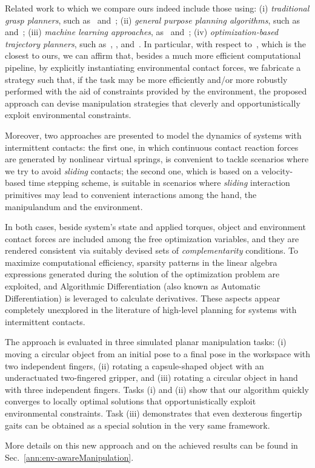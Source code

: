 Related work to which we compare ours indeed include those using: (i) \emph{traditional grasp planners}, such as~\cite{Diankov:PHDTHESIS:2010} and~\cite{Miller:GRASPIT:2004}; (ii) \emph{general purpose planning algorithms}, such as~\cite{Koga:ICRA:1994} and~\cite{Cohen:RSS:2014}; (iii) \emph{machine learning approaches}, as~\cite{Levine:NIPS:2014} and~\cite{Levine:PREPRINT:2014}; (iv) \emph{optimization-based trajectory planners}, such as~\cite{Mordatch:ACMSCA:2012}, \cite{Mordatch:RSS:2014}, and~\cite{Posa:IJRR:2014}. In particular, with respect to~\cite{Posa:IJRR:2014}, which is the closest to ours, we can affirm that, besides a much more efficient computational pipeline, by explicitly instantiating environmental contact forces, we fabricate a strategy such that, if the task may be more efficiently and/or more robustly performed with the aid of constraints provided by the environment, the proposed approach can devise manipulation strategies that cleverly and opportunistically exploit environmental constraints.

Moreover, 
two approaches are presented to model the dynamics of systems with intermittent contacts: the first one, in which continuous contact reaction forces are generated  by nonlinear virtual springs, is convenient to tackle scenarios where we try to avoid \emph{sliding} contacts; the second one, which is based on a velocity-based time stepping scheme, is suitable in scenarios where \emph{sliding} interaction primitives may lead to convenient interactions among the hand, the manipulandum and the environment.

In both cases, beside system's state and applied torques, object and environment contact forces are included among the free optimization variables, and they are rendered consistent via suitably devised sets of \emph{complementarity} conditions. To maximize computational efficiency, sparsity patterns in the linear algebra expressions generated during the solution of the optimization problem are exploited, and Algorithmic Differentiation (also known as Automatic Differentiation) is leveraged to calculate derivatives. These aspects appear completely unexplored in the literature of high-level planning for systems with intermittent contacts.

The approach is evaluated in three simulated planar manipulation tasks: (i) moving a circular object from an initial pose to a final pose in the workspace with two independent fingers, (ii) rotating a capsule-shaped object with an underactuated two-fingered gripper, and (iii) rotating a circular object in hand with three independent fingers. Tasks (i) and (ii) show that our algorithm quickly converges to locally optimal solutions that opportunistically exploit environmental constraints. Task (iii) demonstrates that even dexterous fingertip gaits can be obtained as a special solution in the very same framework.

More details on this new approach and on the achieved results can be found in Sec.~\ref{ann:env-awareManipulation}. %